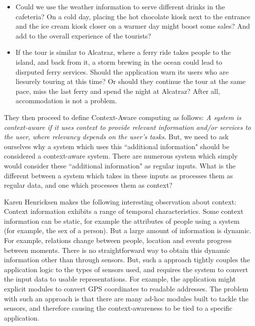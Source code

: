 \begin{itemize}
\item Could we use the weather information to serve different drinks in the cafeteria? On a cold day, placing the hot chocolate kiosk next to the entrance and the ice cream kiosk closer on a warmer day might boost some sales? And add to the overall experience of the tourists?
\item If the tour is similar to Alcatraz, where a ferry ride takes people to the island, and back from it, a storm brewing in the ocean could lead to disrputed ferry services. Should the application warn its users who are liesurely touring at this time? Or should they continue the tour at the same pace, miss the last ferry and spend the night at Alcatraz? After all, accommodation is not a problem.
\end{itemize}

They then proceed to define Context-Aware computing as follows: \textit{A system is context-aware if it uses context to provide relevant information and/or services to the user, where relevancy depends on the user's tasks}. But, we need to ask ourselves why a system which uses this ``additional information" should be considered a context-aware system. There are numerous system which simply would consider these ``additional information" as regular inputs. What is the different between a system which takes in these inputs as processes them as regular data, and one which processes them as context?

Karen Henricksen \cite{henricksen2002modeling} makes the following interesting observation about context: Context information exhibits a range of temporal characteristics. Some context information can be static, for example the attributes of people using a system (for example, the sex of a person). But a large amount of information is dynamic. For example, relations change between people, location and events progress between moments. There is no straightforward way to obtain this dynamic information other than through sensors. But, such a approach tightly couples the application logic to the types of sensors used, and requires the system to convert the input data to usable representations. For example, the application might explicit modules to convert GPS coordinates to readable addresses. The problem with such an approach is that there are many ad-hoc modules built to tackle the sensors, and therefore causing the context-awareness to be tied to a specific application.

